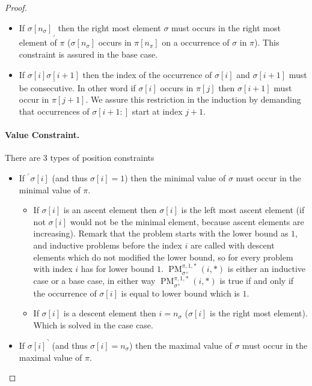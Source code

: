 \documentclass[a4paper]{llncs}
\newcommand{\ptext}{\pi}
\newcommand{\pmotif}{\sigma}
\newcommand{\pbmotif}{\pmotif^+}
\DeclareMathOperator{\PMa}{PM}
\newcommand{\PM}[6]{\PMa_{{#1}}^{{#2},{#3},{#4}}({#5},{#6})}
\begin{document}
\begin{proof}
\begin{itemize}
	\item If ${\pmotif[n_\pmotif]}_\lrcorner$ then the right most element $\sigma$ must occurs in the right most element of $\pi$ ($\pmotif[n_\pmotif]$ occurs in $\ptext[n_\ptext]$ on a occurrence of $\pmotif$ in $\ptext$). This constraint is assured in the base case.

	\item If $\underline{\pmotif[i]\pmotif[i+1]}$ then the index of the occurrence of $\pmotif[i]$ and $\pmotif[i+1]$ must be consecutive. In other word if $\pmotif[i]$ occurs in $\ptext[j]$ then $\pmotif[i+1]$ must occur in $\ptext[j+1]$. We assure this restriction in the induction by demanding that occurrences of $\pmotif[i+1:]$  start at index $j+1$.
\end{itemize}

\paragraph{Value Constraint.} There are 3 types of position constraints
\begin{itemize}
	\item If $^\ulcorner{\sigma[i]}$ (and thus $\sigma[i]=1$) then the minimal value of $\pmotif$ must occur in the minimal value of $\ptext$.
	\begin{itemize}

		\item If $\sigma[i]$ is an ascent element then $\sigma[i]$ is the left most ascent element (if not $\sigma[i]$ would not be the minimal element, because ascent elements are increasing). Remark that the problem starts with the lower bound as $1$, and inductive problems before the index $i$ are called with descent elements which do not modified the lower bound, so for every problem with index $i$ has for lower bound $1$. 
		$\PM{\pbmotif}{\ptext}{1}{*}{i}{*}$ is either an inductive case or a base case, in either way  $\PM{\pbmotif}{\ptext}{1}{*}{i}{*}$ is true if and only if the occurrence of $\sigma[i]$ is equal to lower bound which is  $1$.	
				
		\item If $\sigma[i]$ is a descent element then $i=n_\pmotif$ ($\sigma[i]$ is the right most element). Which is solved in the case case.

	\end{itemize}




	\item If ${\pmotif[i]}^\urcorner$ (and thus $\sigma[i]=n_\pmotif$) then the maximal value of $\pmotif$ must occur in the maximal value of $\ptext$.
	\begin{itemize}


\end{itemize}
\end{itemize}
\end{proof}
\end{document}
